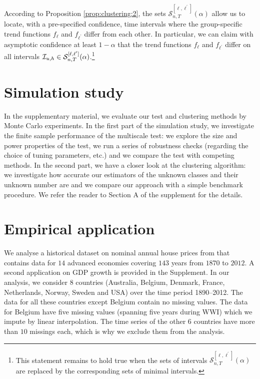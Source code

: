 \documentclass[12pt]{article}
\begin{document}
According to Proposition \ref{prop:clustering:2}, the sets $\mathcal{S}^{[\ell,\ell^\prime]}_{n, T}(\alpha)$ allow us to locate, with a pre-specified confidence, time intervals where the group-specific trend functions $f_\ell$ and $f_{\ell^\prime}$ differ from each other. In particular, we can claim with asymptotic confidence at least $1 - \alpha$ that the trend functions $f_\ell$ and $f_{\ell^\prime}$ differ on all intervals $\mathcal{I}_{u, h} \in \mathcal{S}^{[\ell,\ell^\prime]}_{n, T}(\alpha)$.\footnote{This statement remains to hold true when the sets of intervals $\mathcal{S}^{[\ell,\ell^\prime]}_{n, T}(\alpha)$ are replaced by the corresponding sets of minimal intervals.} 



{\color{black}
\section{Simulation study}\label{sec:app-sim-summary}


In the supplementary material, we evaluate our test and clustering methods
by Monte Carlo experiments. 
In the first part of the simulation study, we investigate the finite sample performance of the multiscale test: we explore the size and power properties of the test, we run a series of robustness checks (regarding the choice of tuning parameters, etc.) and we compare the test with competing methods.  
In the second part, we have a closer look at the clustering algorithm: we investigate how accurate our estimators of the unknown classes and their unknown number are and we compare our approach with a simple benchmark procedure. We refer the reader to Section A of the supplement for the details. 
}



\section{Empirical application}\label{sec:app}


We analyse a historical dataset on nominal annual house prices from \cite{Knoll2017} that contains data for $14$ advanced economies covering $143$ years from $1870$ to $2012$. 
A second application on GDP growth is provided in the Supplement. 
In our analysis, we consider 8 countries (Australia, Belgium, Denmark, France, Netherlands, Norway, Sweden and USA) over the time period 1890--2012. The data for all these countries except Belgium contain no missing values. The data for Belgium have five missing values (spanning five years during WWI) 
which we impute by linear interpolation. The time series of the other $6$ countries have more than $10$ missings each, which is why we exclude them from the analysis.
\end{document}
